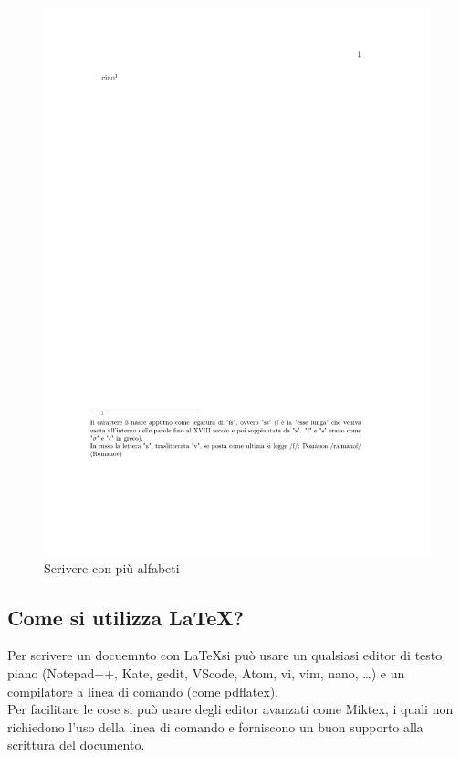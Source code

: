 \documentclass[a4paper,12pt]{article}
\newcommand{\1}{\ensuremath{\mathds{1}}}
\begin{document}
\begin{figure}[!h]\centering
  \includegraphics[width=\textwidth,page=1]{img/alfabeti}
  \caption{Scrivere con più alfabeti}
\end{figure}
\subsection{Come si utilizza \LaTeX?}
  Per scrivere un docuemnto con \LaTeX si può usare un qualsiasi editor di testo piano (Notepad++, Kate, gedit, VScode, Atom, vi, vim, nano, \dots) e un compilatore a linea di comando (come pdflatex).\\
  Per facilitare le cose si può usare degli editor avanzati come Miktex, i quali non richiedono l'uso della linea di comando e forniscono un buon supporto alla scrittura del documento.
\end{document}
